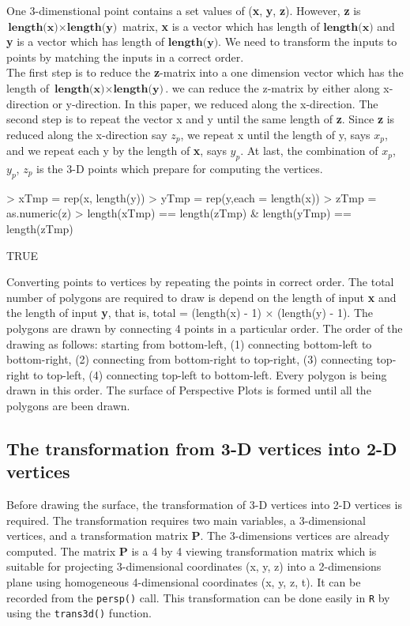 \documentclass[11pt,twoside]{report}
\begin{document}
One 3-dimenstional point contains a set values of (\textbf{x}, \textbf{y}, \textbf{z}). However, \textbf{z} is $\textbf{length(x)} \times \textbf{length(y)}$ matrix, \textbf{x} is a vector which has length of $\textbf{length(x)}$ and \textbf{y} is a vector which has length of $\textbf{length(y)}$. We need to transform the inputs to points by matching the inputs in a correct order.\\

The first step is to reduce the \textbf{z}-matrix into a one dimension vector which has the length of $\textbf{length(x)} \times \textbf{length(y)}$. we can reduce the z-matrix by either along x-direction or y-direction. In this paper, we reduced along the x-direction. The second step is to repeat the vector x and y until the same length of \textbf{z}. Since \textbf{z} is reduced along the x-direction say $z_p$, we repeat x until the length of y, says $x_p$, and we repeat each y by the length of \textbf{x}, says $y_p$. At last, the combination of $x_p$, $y_p$, $z_p$ is the 3-D points which prepare for computing the vertices. 
\begin{Schunk}
\begin{Sinput}
> xTmp = rep(x, length(y))
> yTmp = rep(y,each = length(x))
> zTmp = as.numeric(z)
> length(xTmp) == length(zTmp) & length(yTmp) == length(zTmp)
\end{Sinput}
\begin{Soutput}
[1] TRUE
\end{Soutput}
\end{Schunk}

Converting points to vertices by repeating the points in correct order. The total number of polygons are required to draw is depend on the length of input \textbf{x} and the length of input \textbf{y}, that is, total = (length(x) - 1) $\times$ (length(y) - 1). The polygons are drawn by connecting 4 points in a particular order. The order of the drawing as follows: starting from bottom-left, (1) connecting bottom-left to bottom-right, (2) connecting from bottom-right to top-right, (3) connecting top-right to top-left, (4) connecting top-left to bottom-left. Every polygon is being drawn in this order. The surface of Perspective Plots is formed until all the polygons are been drawn. \\

\subsection{The transformation from 3-D vertices into 2-D vertices}
Before drawing the surface, the transformation of 3-D vertices into 2-D vertices is required. The transformation requires two main variables, a 3-dimensional vertices, and a transformation matrix \textbf{P}. The 3-dimensions vertices are already computed. The matrix \textbf{P} is a 4 by 4 viewing transformation matrix which is suitable for projecting 3-dimensional coordinates (x, y, z) into a 2-dimensions plane using homogeneous 4-dimensional coordinates (x, y, z, t). It can be recorded from the \texttt{persp()} call. This transformation can be done easily in \texttt{R} by using the \texttt{trans3d()} function.
\end{document}

